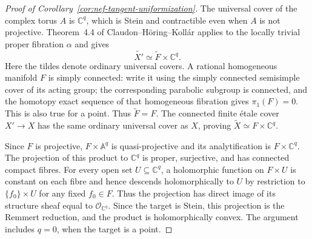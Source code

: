 \begin{proof}[Proof of Corollary~\ref{cor:nef-tangent-uniformization}]
The universal cover of the complex torus $A$ is $\mathbb C^q$, which
is Stein and contractible even when $A$ is not projective.
Theorem~4.4 of Claudon--H\"oring--Koll\'ar
\cite{ClaudonHoringKollar2013} applies to the locally trivial proper
fibration $\alpha$ and gives
\[
 \widetilde {X'}\simeq\widetilde F\times\mathbb C^q.
\]
Here the tildes denote ordinary universal covers. A rational homogeneous
manifold $F$ is simply connected: write it using the simply connected
semisimple cover of its acting group; the corresponding parabolic
subgroup is connected, and the homotopy exact sequence of that
homogeneous fibration gives $\pi_1(F)=0$. This is also true for a point.
Thus $\widetilde F=F$. The connected finite \'{e}tale cover $X'\to X$
has the same ordinary universal cover as $X$, proving
$\widetilde X\simeq F\times\mathbb C^q$.

Since $F$ is projective, $F\times\mathbb A^q$ is quasi-projective and
its analytification is $F\times\mathbb C^q$. The projection of this
product to $\mathbb C^q$ is proper, surjective, and has connected compact
fibres. For every open set $U\subseteq\mathbb C^q$, a holomorphic
function on $F\times U$ is constant on each fibre and hence descends
holomorphically to $U$ by restriction to $\{f_0\}\times U$ for any
fixed $f_0\in F$. Thus the
projection has direct image of its structure sheaf equal to
$\mathcal O_{\mathbb C^q}$. Since the target is Stein, this projection
is the Remmert reduction, and the product is holomorphically convex.
The argument includes $q=0$, when the target is a point.
\end{proof}
